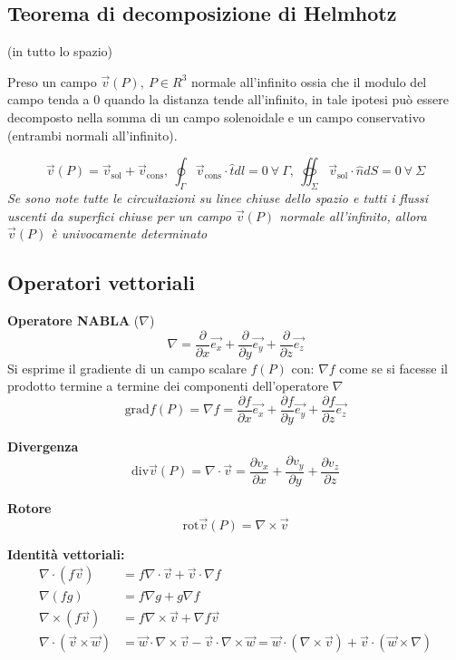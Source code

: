 \subsection{Teorema di decomposizione di Helmhotz} (in tutto lo spazio)

Preso un campo $\vec{v}(P),\ P \in R^3$ normale all'infinito ossia che il modulo del campo tenda
a 0 quando la distanza tende all'infinito, in tale ipotesi può essere decomposto nella somma
di un campo solenoidale e un campo conservativo (entrambi normali all'infinito).

$$
\vec{v}(P) = \vec{v}_\text{sol} + \vec{v}_\text{cons},\ 
\oint_{\Gamma}\vec{v}_\text{cons}\cdot\hat{t} dl = 0\ \forall\ \Gamma,\ \oiint_{\Sigma}
\vec{v}_\text{sol}\cdot\hat{n}dS = 0\ \forall\ \Sigma 
$$
\textit{Se sono note tutte le circuitazioni su linee chiuse dello spazio e tutti i flussi uscenti da
superfici chiuse per un campo $\vec{v}(P)$ normale all'infinito, allora $\vec{v}(P)$ è univocamente
determinato}

\newpage
\subsection{Operatori vettoriali}
\textbf{Operatore NABLA} ($\nabla$)
$$
\nabla = \frac{\partial}{\partial x}\vec{e_x} + \frac{\partial}{\partial y}\vec{e_y} + \frac{\partial}{\partial z}\vec{e_z}
$$
Si esprime il gradiente di un campo scalare $f(P)$ con: $\nabla f$ come se si facesse il prodotto
termine a termine dei componenti dell'operatore $\nabla$
$$
\text{grad} f(P) = \nabla f = \frac{\partial f}{\partial x}\vec{e_x} + \frac{\partial f}{\partial y}\vec{e_y} + 
\frac{\partial f}{\partial z}\vec{e_z}
$$

\textbf{Divergenza}
$$
\text{div}\vec{v}(P) = \nabla\cdot\vec{v} = \frac{\partial v_x}{\partial x} + \frac{\partial v_y}{\partial y} +
\frac{\partial v_z}{\partial z}
$$

\textbf{Rotore}
$$
\text{rot}\vec{v}(P) = \nabla \times \vec{v}
$$

\textbf{Identità vettoriali:}
\begin{align*}
\nabla\cdot(f\vec{v}) &= f\nabla\cdot\vec{v} + \vec{v}\cdot \nabla f \\
\nabla(f g) &= f\nabla g + g\nabla f \\
\nabla \times (f\vec{v}) &= f\nabla\times\vec{v} + \nabla f \vec{v} \\
\nabla\cdot (\vec{v}\times\vec{w}) &= \vec{w}\cdot\nabla\times\vec{v} - \vec{v}\cdot\nabla\times\vec{w}
= \vec{w}\cdot(\nabla\times\vec{v}) + \vec{v}\cdot (\vec{w}\times\nabla)
\end{align*}

